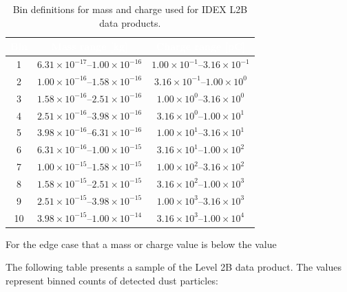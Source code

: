 \begin{table}[h!]
\centering
\renewcommand{\arraystretch}{1.9}
\setlength{\tabcolsep}{8pt}
\begin{tabular}{|c|c|c|}
\hline
\rowcolor{darkGrey}
\textcolor{white}{\textbf{Bin}} &
\textcolor{white}{\textbf{Mass range [kg]}} &
\textcolor{white}{\textbf{Charge range [pC]}} \\
\hline
1  & $6.31\times10^{-17}$--$1.00\times10^{-16}$ & $1.00\times10^{-1}$--$3.16\times10^{-1}$ \\
2  & $1.00\times10^{-16}$--$1.58\times10^{-16}$ & $3.16\times10^{-1}$--$1.00\times10^{0}$ \\
3  & $1.58\times10^{-16}$--$2.51\times10^{-16}$ & $1.00\times10^{0}$--$3.16\times10^{0}$ \\
4  & $2.51\times10^{-16}$--$3.98\times10^{-16}$ & $3.16\times10^{0}$--$1.00\times10^{1}$ \\
5  & $3.98\times10^{-16}$--$6.31\times10^{-16}$ & $1.00\times10^{1}$--$3.16\times10^{1}$ \\
6  & $6.31\times10^{-16}$--$1.00\times10^{-15}$ & $3.16\times10^{1}$--$1.00\times10^{2}$ \\
7  & $1.00\times10^{-15}$--$1.58\times10^{-15}$ & $1.00\times10^{2}$--$3.16\times10^{2}$ \\
8  & $1.58\times10^{-15}$--$2.51\times10^{-15}$ & $3.16\times10^{2}$--$1.00\times10^{3}$ \\
9  & $2.51\times10^{-15}$--$3.98\times10^{-15}$ & $1.00\times10^{3}$--$3.16\times10^{3}$ \\
10 & $3.98\times10^{-15}$--$1.00\times10^{-14}$ & $3.16\times10^{3}$--$1.00\times10^{4}$ \\
\hline
\end{tabular}
\caption{Bin definitions for mass and charge used for IDEX L2B data products.}
\label{tab:charge_mass_bins}
\end{table}

For the edge case that a mass or charge value is below the value 

The following table presents a sample of the Level 2B data product. The values represent binned counts of detected dust particles:






